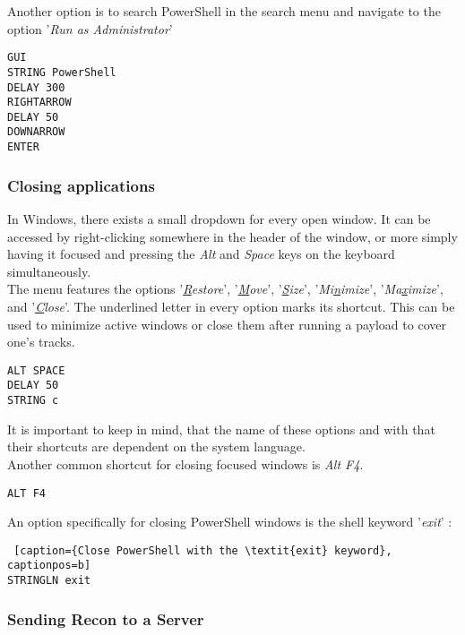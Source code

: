 Another option is to search PowerShell in the search menu and navigate to the option '\textit{Run as Administrator}' \\
\begin{lstlisting}[caption={Open PowerShell with admin rights via Search Menu}, captionpos=b]
GUI
STRING PowerShell
DELAY 300
RIGHTARROW
DELAY 50
DOWNARROW
ENTER
\end{lstlisting}

\subsubsection{Closing applications}

In Windows, there exists a small dropdown for every open window. It can be accessed by right-clicking somewhere in the header of the window, or more simply having it focused and pressing the \textit{Alt} and \textit{Space} keys on the keyboard simultaneously. \\
The menu features the options '\textit{\underline{R}estore}', '\textit{\underline{M}ove}', '\textit{\underline{S}ize}', '\textit{Mi\underline{n}imize}', '\textit{Ma\underline{x}imize}', and '\textit{\underline{C}lose}'. The underlined letter in every option marks its shortcut. This can be used to minimize active windows or close them after running a payload to cover one's tracks.
\begin{lstlisting}[caption={Close a window through its window menu}, captionpos=b]
ALT SPACE
DELAY 50
STRING c
\end{lstlisting}
It is important to keep in mind, that the name of these options and with that their shortcuts are dependent on the system language. \\
Another common shortcut for closing focused windows is \textit{Alt F4}.
\begin{lstlisting}[caption={Close a window with ALT F4}, captionpos=b]
ALT F4
\end{lstlisting}


An option specifically for closing PowerShell windows is the shell keyword '\textit{exit}' :
\begin{lstlisting} [caption={Close PowerShell with the \textit{exit} keyword}, captionpos=b]
STRINGLN exit
\end{lstlisting}


\subsubsection{Sending Recon to a Server}

